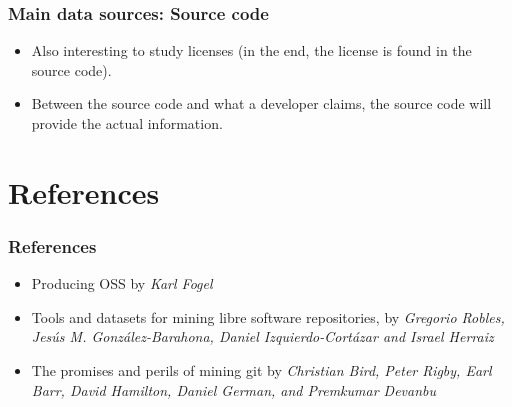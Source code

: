 \documentclass{beamer}
\begin{document}
\begin{frame}
 \frametitle{Main data sources: Source code}
 \begin{itemize}
 \item Also interesting to study licenses (in the end, the license is found
 in the source code).
 \item Between the source code and what a developer claims, the source code will 
 provide the actual information.
 \end{itemize}

\end{frame}

\section{References}

\begin{frame}
 \frametitle{References}
 \begin{itemize}
 \item Producing OSS by \textit{Karl Fogel}
 \item Tools and datasets for mining libre software repositories, by
 \textit{Gregorio Robles, Jes\'us M. Gonz\'alez-Barahona, Daniel Izquierdo-Cort\'azar and Israel Herraiz}
 \item The promises and perils of mining git by
 \textit{Christian Bird, Peter Rigby, Earl Barr, David Hamilton, Daniel German, and Premkumar Devanbu}
 \end{itemize}

\end{frame}
\end{document}

